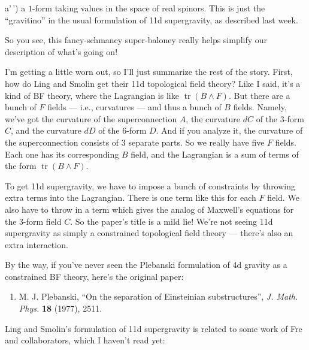 \documentclass{article}
\def\tightlist{}
\renewcommand{\texttt}[1]{%
  \begingroup
  \ttfamily
  \begingroup\lccode`~=`/\lowercase{\endgroup\def~}{/\discretionary{}{}{}}%
  \begingroup\lccode`~=`[\lowercase{\endgroup\def~}{[\discretionary{}{}{}}%
  \begingroup\lccode`~=`.\lowercase{\endgroup\def~}{.\discretionary{}{}{}}%
  \catcode`/=\active\catcode`[=\active\catcode`.=\active
  \scantokens{#1\noexpand}%
  \endgroup
}
\begin{document}
a'\,') a \(1\)-form taking values in the space of real spinors. This is
just the ``gravitino'' in the usual formulation of 11d supergravity, as
described last week.

So you see, this fancy-schmancy super-baloney really helps simplify our
description of what's going on!

I'm getting a little worn out, so I'll just summarize the rest of the
story. First, how do Ling and Smolin get their 11d topological field
theory? Like I said, it's a kind of BF theory, where the Lagrangian is
like \(\operatorname{tr}(B\wedge F)\). But there are a bunch of \(F\)
fields --- i.e., curvatures --- and thus a bunch of \(B\) fields.
Namely, we've got the curvature of the superconnection \(A\), the
curvature \(dC\) of the \(3\)-form \(C\), and the curvature \(dD\) of
the \(6\)-form \(D\). And if you analyze it, the curvature of the
superconnection consists of 3 separate parts. So we really have five
\(F\) fields. Each one has its corresponding \(B\) field, and the
Lagrangian is a sum of terms of the form
\(\operatorname{tr}(B\wedge F)\).

To get 11d supergravity, we have to impose a bunch of constraints by
throwing extra terms into the Lagrangian. There is one term like this
for each \(F\) field. We also have to throw in a term which gives the
analog of Maxwell's equations for the \(3\)-form field \(C\). So the
paper's title is a mild lie! We're not seeing 11d supergravity as simply
a constrained topological field theory --- there's also an extra
interaction.

By the way, if you've never seen the Plebanski formulation of 4d gravity
as a constrained BF theory, here's the original paper:

\begin{enumerate}
\def\labelenumi{\arabic{enumi})}
\setcounter{enumi}{1}
\tightlist
\item
  M. J. Plebanski, ``On the separation of Einsteinian substructures'',
  \emph{J. Math. Phys.} \textbf{18} (1977), 2511.
\end{enumerate}

Ling and Smolin's formulation of 11d supergravity is related to some
work of Fre and collaborators, which I haven't read yet:

\end{document}

